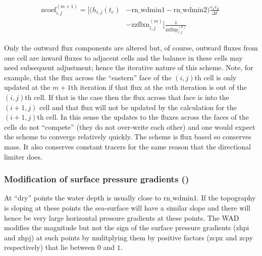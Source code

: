 \begin{equation} \label{dyn_wd_continuity_nxtcoef}
\begin{split}
\mathrm{zcoef}^{(m+1)}_{i,j} = \Big[ (h_{i,j}(t_e) & - \mathrm{rn\_wdmin1} - \mathrm{rn\_wdmin2})  \frac{e_1 e_2}{\Delta t} \phantom{]} \\
\phantom{[} & -  \mathrm{zzflxn}^{(m)}_{i,j} \Big] \frac{1}{ \mathrm{zzflxp}^{(0)}_{i,j} } 
\end{split}
\end{equation} 

Only the outward flux components are altered but, of course, outward fluxes from one cell
are inward fluxes to adjacent cells and the balance in these cells may need subsequent
adjustment; hence the iterative nature of this scheme.  Note, for example, that the flux
across the ``eastern'' face of the $(i,j)$th cell is only updated at the $m+1$th iteration
if that flux at the $m$th iteration is out of the $(i,j)$th cell. If that is the case then
the flux across that face is into the $(i+1,j)$ cell and that flux will not be updated by
the calculation for the $(i+1,j)$th cell. In this sense the updates to the fluxes across
the faces of the cells do not ``compete'' (they do not over-write each other) and one
would expect the scheme to converge relatively quickly. The scheme is flux based so
conserves mass. It also conserves constant tracers for the same reason that the 
directional limiter does.  


\subsubsection   [Modification of surface pressure gradients (\textit{dynhpg})]
			{Modification of surface pressure gradients ()}
\label{DYN_wd_il_spg}

At ``dry'' points the water depth is usually close to $\mathrm{rn\_wdmin1}$. If the
topography is sloping at these points the sea-surface will have a similar slope and there
will hence be very large horizontal pressure gradients at these points. The WAD modifies
the magnitude but not the sign of the surface pressure gradients (zhpi and zhpj) at such
points by mulitplying them by positive factors (zcpx and zcpy respectively) that lie
between $0$ and $1$.

